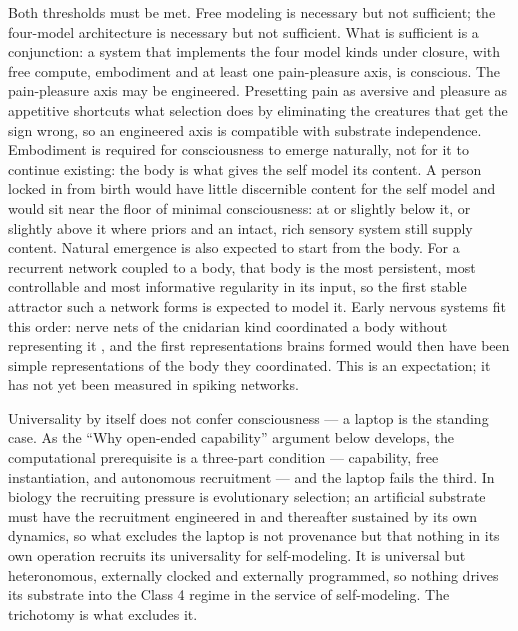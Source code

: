 \documentclass[12pt]{article}
\newcommand{\revstart}{}
\newcommand{\revend}{}
\begin{document}
Both thresholds must be met. Free modeling is necessary but not sufficient; the four-model architecture is necessary but not sufficient. What is sufficient is a conjunction: a system that implements the four model kinds under closure, with free compute, embodiment and at least one pain-pleasure axis, is conscious. The pain-pleasure axis may be engineered. Presetting pain as aversive and pleasure as appetitive shortcuts what selection does by eliminating the creatures that get the sign wrong, so an engineered axis is compatible with substrate independence. Embodiment is required for consciousness to emerge naturally, not for it to continue existing: the body is what gives the self model its content. A person locked in from birth would have little discernible content for the self model and would sit near the floor of minimal consciousness: at or slightly below it, or slightly above it where priors and an intact, rich sensory system still supply content. Natural emergence is also expected to start from the body. For a recurrent network coupled to a body, that body is the most persistent, most controllable and most informative regularity in its input, so the first stable attractor such a network forms is expected to model it. Early nervous systems fit this order: nerve nets of the cnidarian kind coordinated a body without representing it \citep{Keijzer2013}, and the first representations brains formed would then have been simple representations of the body they coordinated. This is an expectation; it has not yet been measured in spiking networks.

{\revstart Universality by itself does not confer consciousness --- a laptop is the standing case. As the ``Why open-ended capability'' argument below develops, the computational prerequisite is a three-part condition --- capability, free instantiation, and autonomous recruitment --- and the laptop fails the third. In biology the recruiting pressure is evolutionary selection; an artificial substrate must have the recruitment engineered in and thereafter sustained by its own dynamics, so what excludes the laptop is not provenance but that nothing in its own operation recruits its universality for self-modeling. It is universal but heteronomous, externally clocked and externally programmed, so nothing drives its substrate into the Class 4 regime in the service of self-modeling. The trichotomy is what excludes it.\revend}
\end{document}

